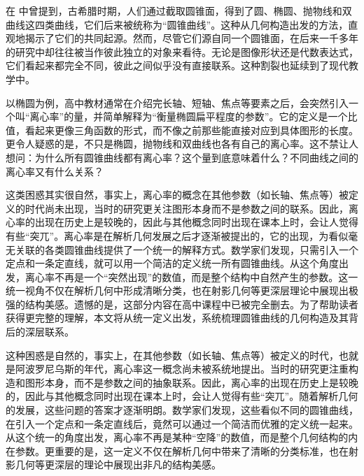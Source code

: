 
\begin{issues}
\issueDraft
\end{issues}


在 中曾提到，古希腊时期，人们通过截取圆锥面，得到了圆、椭圆、抛物线和双曲线这四类曲线，它们后来被统称为“圆锥曲线”。这种从几何构造出发的方法，直观地揭示了它们的共同起源。然而，尽管它们源自同一个圆锥面，在后来一千多年的研究中却往往被当作彼此独立的对象来看待。无论是图像形状还是代数表达式，它们看起来都完全不同，彼此之间似乎没有直接联系。这种割裂也延续到了现代教学中。

以椭圆为例，高中教材通常在介绍完长轴、短轴、焦点等要素之后，会突然引入一个叫“离心率”的量，并简单解释为“衡量椭圆扁平程度的参数”。它的定义是一个比值，看起来更像三角函数的形式，而不像之前那些能直接对应到具体图形的长度。更令人疑惑的是，不只是椭圆，抛物线和双曲线也各有自己的离心率。这不禁让人想问：为什么所有圆锥曲线都有离心率？这个量到底意味着什么？不同曲线之间的离心率又有什么关系？

这类困惑其实很自然，事实上，离心率的概念在其他参数（如长轴、焦点等）被定义的时代尚未出现，当时的研究更关注图形本身而不是参数之间的联系。因此，离心率的出现在历史上是较晚的，因此与其他概念同时出现在课本上时，会让人觉得有些“突兀”。离心率是在解析几何发展之后才逐渐被提出的，它的出现，为看似毫无关联的各类圆锥曲线提供了一个统一的解释方式。数学家们发现，只需引入一个定点和一条定直线，就可以用一个简洁的定义统一所有圆锥曲线。从这个角度出发，离心率不再是一个“突然出现”的数值，而是整个结构中自然产生的参数。这一统一视角不仅在解析几何中形成清晰分类，也在射影几何等更深层理论中展现出极强的结构美感。遗憾的是，这部分内容在高中课程中已被完全删去。为了帮助读者获得更完整的理解，本文将从统一定义出发，系统梳理圆锥曲线的几何构造及其背后的深层联系。


这种困惑是自然的，事实上，在其他参数（如长轴、焦点等）被定义的时代，也就是阿波罗尼乌斯的年代，离心率这一概念尚未被系统地提出。当时的研究更注重构造和图形本身，而不是参数之间的抽象联系。因此，离心率的出现在历史上是较晚的，因此与其他概念同时出现在课本上时，会让人觉得有些“突兀”。随着解析几何的发展，这些问题的答案才逐渐明朗。数学家们发现，这些看似不同的圆锥曲线，在引入一个定点和一条定直线后，竟然可以通过一个简洁而优雅的定义统一起来。从这个统一的角度出发，离心率不再是某种“空降”的数值，而是整个几何结构的内在参数。更重要的是，这一定义不仅在解析几何中带来了清晰的分类标准，也在射影几何等更深层的理论中展现出非凡的结构美感。

